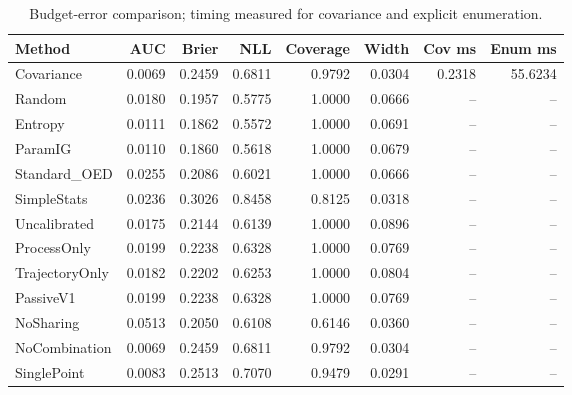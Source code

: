 \begin{table}[t]
\caption{Budget-error comparison; timing measured for covariance and explicit enumeration.}
\label{tab:experiment2}
\begin{tabular}{lrrrrrrr}
\toprule
Method & AUC & Brier & NLL & Coverage & Width & Cov ms & Enum ms \\
\midrule
Covariance & 0.0069 & 0.2459 & 0.6811 & 0.9792 & 0.0304 & 0.2318 & 55.6234 \\
Random & 0.0180 & 0.1957 & 0.5775 & 1.0000 & 0.0666 & -- & -- \\
Entropy & 0.0111 & 0.1862 & 0.5572 & 1.0000 & 0.0691 & -- & -- \\
ParamIG & 0.0110 & 0.1860 & 0.5618 & 1.0000 & 0.0679 & -- & -- \\
Standard\_OED & 0.0255 & 0.2086 & 0.6021 & 1.0000 & 0.0666 & -- & -- \\
SimpleStats & 0.0236 & 0.3026 & 0.8458 & 0.8125 & 0.0318 & -- & -- \\
Uncalibrated & 0.0175 & 0.2144 & 0.6139 & 1.0000 & 0.0896 & -- & -- \\
ProcessOnly & 0.0199 & 0.2238 & 0.6328 & 1.0000 & 0.0769 & -- & -- \\
TrajectoryOnly & 0.0182 & 0.2202 & 0.6253 & 1.0000 & 0.0804 & -- & -- \\
PassiveV1 & 0.0199 & 0.2238 & 0.6328 & 1.0000 & 0.0769 & -- & -- \\
NoSharing & 0.0513 & 0.2050 & 0.6108 & 0.6146 & 0.0360 & -- & -- \\
NoCombination & 0.0069 & 0.2459 & 0.6811 & 0.9792 & 0.0304 & -- & -- \\
SinglePoint & 0.0083 & 0.2513 & 0.7070 & 0.9479 & 0.0291 & -- & -- \\
\bottomrule
\end{tabular}
\end{table}
